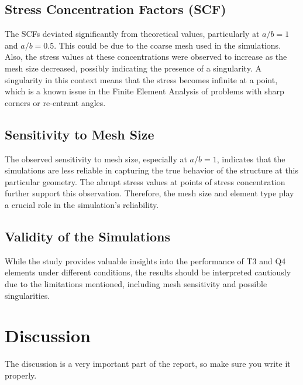 \documentclass[twoside,twocolumn,10pt]{article}
\begin{document}
\subsection*{Stress Concentration Factors (SCF)}

The SCFs deviated significantly from theoretical values, particularly at \( a/b = 1 \) and \( a/b = 0.5 \). This could be due to the coarse mesh used in the simulations. Also, the stress values at these concentrations were observed to increase as the mesh size decreased, possibly indicating the presence of a singularity. A singularity in this context means that the stress becomes infinite at a point, which is a known issue in the Finite Element Analysis of problems with sharp corners or re-entrant angles.

\subsection*{Sensitivity to Mesh Size}

The observed sensitivity to mesh size, especially at \( a/b = 1 \), indicates that the simulations are less reliable in capturing the true behavior of the structure at this particular geometry. The abrupt stress values at points of stress concentration further support this observation. Therefore, the mesh size and element type play a crucial role in the simulation's reliability.

\subsection*{Validity of the Simulations}

While the study provides valuable insights into the performance of T3 and Q4 elements under different conditions, the results should be interpreted cautiously due to the limitations mentioned, including mesh sensitivity and possible singularities.






\section{Discussion}

The discussion is a very important part of the report, so make sure you write it properly.\cite{jin2014solution} 

\end{document}
